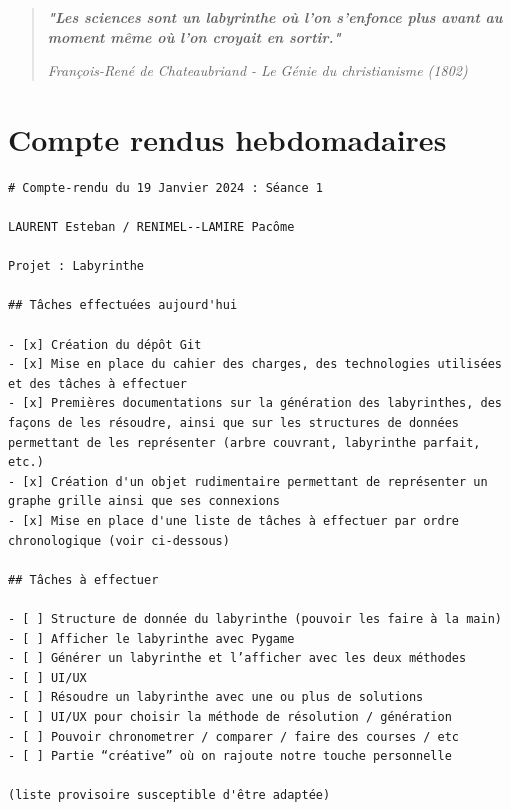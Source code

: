 \documentclass[12pt]{scrreprt} %
\begin{document}
\begin{quotation}
    \textbf{\textit{"Les sciences sont un labyrinthe où l'on s'enfonce plus avant au moment même où l'on croyait en sortir."}}

    \textit{François-René de Chateaubriand - Le Génie du christianisme (1802)}
\end{quotation}

\newpage %
\renewcommand{\bibname}{Bibliographie} %


\chapter*{Compte rendus hebdomadaires}

\begin{verbatim}
# Compte-rendu du 19 Janvier 2024 : Séance 1

LAURENT Esteban / RENIMEL--LAMIRE Pacôme

Projet : Labyrinthe

## Tâches effectuées aujourd'hui

- [x] Création du dépôt Git
- [x] Mise en place du cahier des charges, des technologies utilisées et des tâches à effectuer
- [x] Premières documentations sur la génération des labyrinthes, des façons de les résoudre, ainsi que sur les structures de données permettant de les représenter (arbre couvrant, labyrinthe parfait, etc.)
- [x] Création d'un objet rudimentaire permettant de représenter un graphe grille ainsi que ses connexions
- [x] Mise en place d'une liste de tâches à effectuer par ordre chronologique (voir ci-dessous)

## Tâches à effectuer

- [ ] Structure de donnée du labyrinthe (pouvoir les faire à la main)
- [ ] Afficher le labyrinthe avec Pygame
- [ ] Générer un labyrinthe et l’afficher avec les deux méthodes
- [ ] UI/UX
- [ ] Résoudre un labyrinthe avec une ou plus de solutions
- [ ] UI/UX pour choisir la méthode de résolution / génération
- [ ] Pouvoir chronometrer / comparer / faire des courses / etc
- [ ] Partie “créative” où on rajoute notre touche personnelle

(liste provisoire susceptible d'être adaptée)
\end{verbatim}
\end{document}
